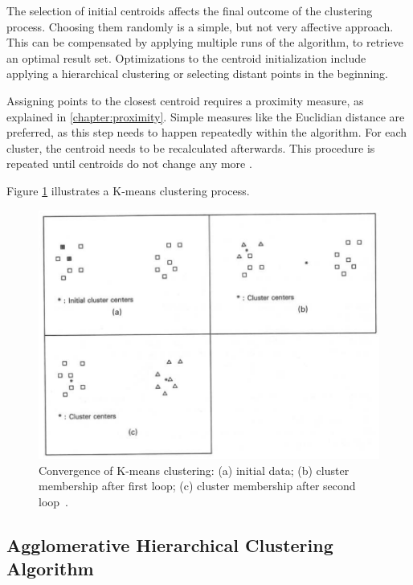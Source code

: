 The selection of initial centroids affects the final outcome of the clustering process. Choosing them randomly is a simple, but not very affective approach. This can be compensated by applying multiple runs of the algorithm, to retrieve an optimal result set. Optimizations to the centroid initialization include applying a hierarchical clustering or selecting distant points in the beginning.

Assigning points to the closest centroid requires a proximity measure, as explained in \ref{chapter:proximity}. Simple measures like the Euclidian distance are preferred, as this step needs to happen repeatedly within the algorithm. For each cluster, the centroid needs to be recalculated afterwards. This procedure is repeated until centroids do not change any more \cite{Jain99clusterreview, Meert06clustermaps}.

Figure \ref{fig:clustering_k-means} illustrates a K-means clustering process.

\begin{figure}[h]
  \begin{center}
    \includegraphics[width=1\textwidth]{figures/clustering_k-means.png}
    \caption{Convergence of K-means clustering: (a) initial data; (b) cluster membership after first loop; (c) cluster membership after second loop~\cite[p 99]{Jain88clustering}.}
    \label{fig:clustering_k-means}
  \end{center}
\end{figure}


\subsection{Agglomerative Hierarchical Clustering Algorithm}
\label{chapter:clustering-hierarchical}

